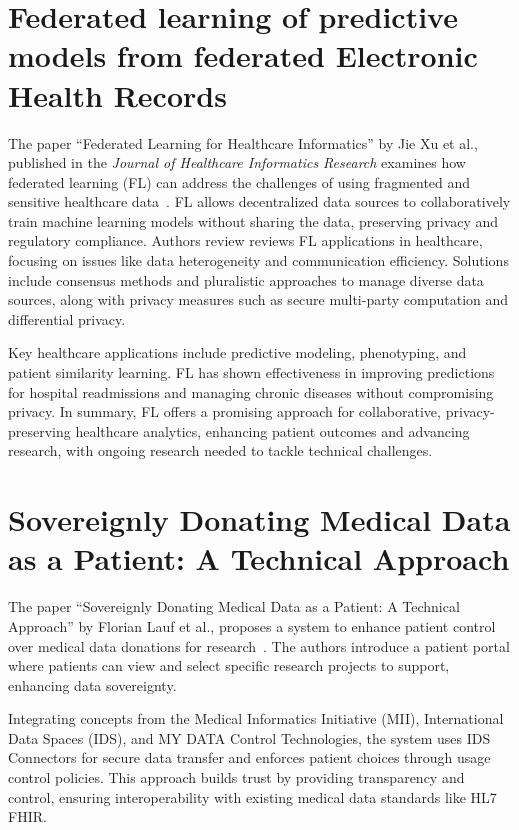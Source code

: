 \section{Federated learning of predictive models from federated Electronic Health Records}\label{sec:federated-learning-of-predictive-models-from-federated-electronic-health-records}

The paper ``Federated Learning for Healthcare Informatics'' by Jie Xu et al., published in the \textit{Journal of Healthcare Informatics Research} examines how federated learning (FL) can address the challenges of using fragmented and sensitive healthcare data~\cite{federated_learning_for_healthcare_infromatics}.
FL allows decentralized data sources to collaboratively train machine learning models without sharing the data, preserving privacy and regulatory compliance.
Authors review reviews FL applications in healthcare, focusing on issues like data heterogeneity and communication efficiency.
Solutions include consensus methods and pluralistic approaches to manage diverse data sources, along with privacy measures such as secure multi-party computation and differential privacy.

Key healthcare applications include predictive modeling, phenotyping, and patient similarity learning.
FL has shown effectiveness in improving predictions for hospital readmissions and managing chronic diseases without compromising privacy.
In summary, FL offers a promising approach for collaborative, privacy-preserving healthcare analytics, enhancing patient outcomes and advancing research, with ongoing research needed to tackle technical challenges.

\section{Sovereignly Donating Medical Data as a Patient: A Technical Approach}\label{sec:sovereignly-donating-medical-data-as-a-patient:-a-technical-approach}

The paper ``Sovereignly Donating Medical Data as a Patient: A Technical Approach'' by Florian Lauf et al., proposes a system to enhance patient control over medical data donations for research~\cite{sovereignly_donating_medical_data}.
The authors introduce a patient portal where patients can view and select specific research projects to support, enhancing data sovereignty.

Integrating concepts from the Medical Informatics Initiative (MII), International Data Spaces (IDS), and MY DATA Control Technologies, the system uses IDS Connectors for secure data transfer and enforces patient choices through usage control policies.
This approach builds trust by providing transparency and control, ensuring interoperability with existing medical data standards like HL7 FHIR.

